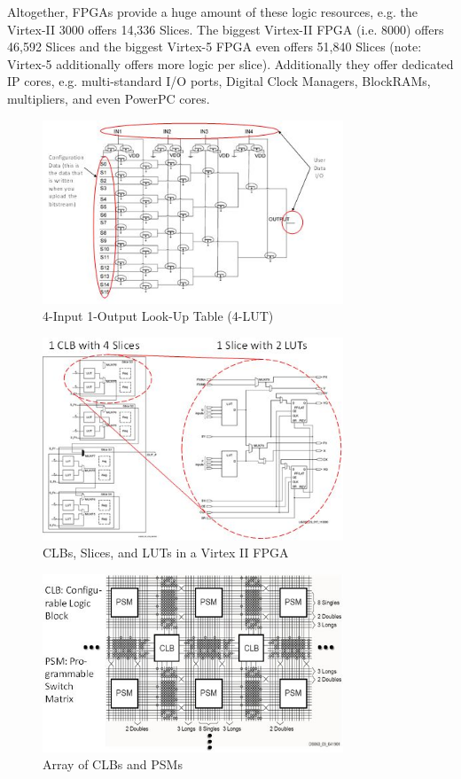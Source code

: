 Altogether, FPGAs provide a huge amount of these logic resources, e.g.
the Virtex-II 3000 offers 14,336 Slices. The biggest Virtex-II FPGA
(i.e. 8000) offers 46,592 Slices and the biggest Virtex-5 FPGA even
offers 51,840 Slices (note: Virtex-5 additionally offers more logic per
slice). Additionally they offer dedicated IP cores, e.g. multi-standard
I/O ports, Digital Clock Managers, BlockRAMs, multipliers, and even
PowerPC cores.
\begin{figure}[!htb]
	\centering
	\includegraphics[width=0.8\textwidth]{src/images/6-7.png}
	\caption{4-Input 1-Output Look-Up Table (4-LUT) \cite{Kalenteridis04}}
	\label{fig:fig67}
\end{figure}
\begin{figure}[!htb]
	\centering
	\includegraphics[width=0.8\textwidth]{src/images/6-8.png}
	\caption{CLBs, Slices, and LUTs in a Virtex II FPGA \cite{XUG002}}
	\label{fig:fig68}
\end{figure}
\begin{figure}[!htb]
	\centering
	\includegraphics[width=0.8\textwidth]{src/images/6-9.png}
	\caption{ Array of CLBs and PSMs \cite{XDS060}}
	\label{fig:fig69}
\end{figure}
